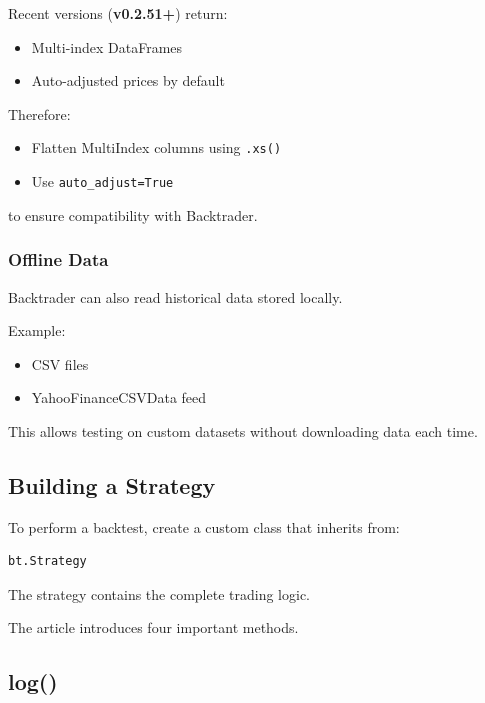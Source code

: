 \documentclass[12pt,openany]{book}
\begin{document}
Recent versions (\textbf{v0.2.51+}) return:

\begin{itemize}[leftmargin=*]
    \item Multi-index DataFrames
    \item Auto-adjusted prices by default
\end{itemize}

Therefore:

\begin{itemize}[leftmargin=*]
    \item Flatten MultiIndex columns using \texttt{.xs()}
    \item Use \texttt{auto\_adjust=True}
\end{itemize}

to ensure compatibility with Backtrader.

\subsubsection{Offline Data}

Backtrader can also read historical data stored locally.

Example:

\begin{itemize}[leftmargin=*]
    \item CSV files
    \item YahooFinanceCSVData feed
\end{itemize}

This allows testing on custom datasets without downloading data each time.

\subsection{Building a Strategy}

To perform a backtest, create a custom class that inherits from:

\begin{Verbatim}[breaklines=true,breakanywhere=true,fontsize=\small]
bt.Strategy
\end{Verbatim}

The strategy contains the complete trading logic.

The article introduces four important methods.

\subsection{log()}
\end{document}
